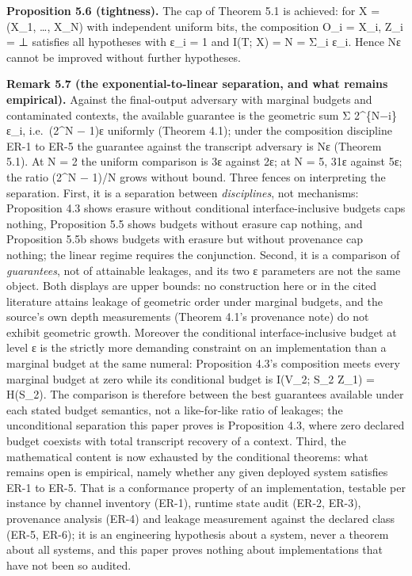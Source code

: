 \documentclass[
  11pt,
]{article}
\begin{document}
\textbf{Proposition 5.6 (tightness).} The cap of Theorem 5.1 is
achieved: for X = (X\_1, \ldots, X\_N) with independent uniform bits,
the composition O\_i = X\_i, Z\_i = ⊥ satisfies all hypotheses with ε\_i
= 1 and I(T; X) = N = Σ\_i ε\_i. Hence Nε cannot be improved without
further hypotheses.

\textbf{Remark 5.7 (the exponential-to-linear separation, and what
remains empirical).} Against the final-output adversary with marginal
budgets and contaminated contexts, the available guarantee is the
geometric sum Σ 2\^{}\{N−i\} ε\_i, i.e.~(2\^{}N − 1)ε uniformly (Theorem
4.1); under the composition discipline ER-1 to ER-5 the guarantee
against the transcript adversary is Nε (Theorem 5.1). At N = 2 the
uniform comparison is 3ε against 2ε; at N = 5, 31ε against 5ε; the ratio
(2\^{}N − 1)/N grows without bound. Three fences on interpreting the
separation. First, it is a separation between \emph{disciplines}, not
mechanisms: Proposition 4.3 shows erasure without conditional
interface-inclusive budgets caps nothing, Proposition 5.5 shows budgets
without erasure cap nothing, and Proposition 5.5b shows budgets with
erasure but without provenance cap nothing; the linear regime requires
the conjunction. Second, it is a comparison of \emph{guarantees}, not of
attainable leakages, and its two ε parameters are not the same object.
Both displays are upper bounds: no construction here or in the cited
literature attains leakage of geometric order under marginal budgets,
and the source's own depth measurements (Theorem 4.1's provenance note)
do not exhibit geometric growth. Moreover the conditional
interface-inclusive budget at level ε is the strictly more demanding
constraint on an implementation than a marginal budget at the same
numeral: Proposition 4.3's composition meets every marginal budget at
zero while its conditional budget is I(V\_2; S\_2 \textbar{} Z\_1) =
H(S\_2). The comparison is therefore between the best guarantees
available under each stated budget semantics, not a like-for-like ratio
of leakages; the unconditional separation this paper proves is
Proposition 4.3, where zero declared budget coexists with total
transcript recovery of a context. Third, the mathematical content is now
exhausted by the conditional theorems: what remains open is empirical,
namely whether any given deployed system satisfies ER-1 to ER-5. That is
a conformance property of an implementation, testable per instance by
channel inventory (ER-1), runtime state audit (ER-2, ER-3), provenance
analysis (ER-4) and leakage measurement against the declared class
(ER-5, ER-6); it is an engineering hypothesis about a system, never a
theorem about all systems, and this paper proves nothing about
implementations that have not been so audited.
\end{document}
